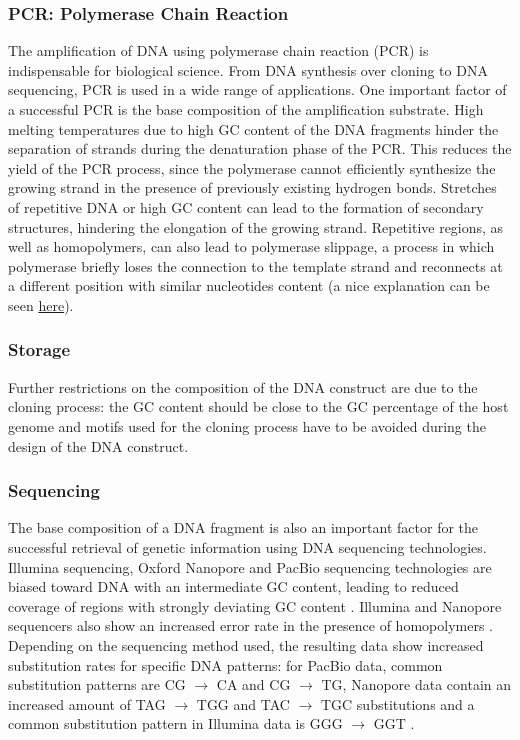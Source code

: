 \subsubsection{PCR: Polymerase Chain Reaction}

The amplification of DNA using polymerase chain reaction (PCR) is indispensable for biological science. From DNA synthesis over cloning to DNA sequencing, PCR is used in a wide range of applications. 
One important factor of a successful PCR is the base composition of the amplification substrate. High melting temperatures due to high GC content of the DNA fragments hinder the separation of strands during the denaturation phase of the PCR. 
This reduces the yield of the PCR process, since the polymerase cannot efficiently synthesize the growing strand in the presence of previously existing hydrogen bonds. 
Stretches of repetitive DNA or high GC content can lead to the formation of secondary structures, hindering the elongation of the growing strand. 
Repetitive regions, as well as homopolymers, can also lead to polymerase slippage, a process in which polymerase briefly loses the connection to the template strand and reconnects at a different position with similar nucleotides content \cite{bib:102144} (a nice explanation can be seen \href{https://yewtu.be/watch?v=nRPNJ1T-ggg}{here}).

\subsubsection{Storage}

Further restrictions on the composition of the DNA construct are due to the cloning process: the GC content should be close to the GC percentage of the host genome and motifs used for the cloning process have to be avoided during the design of the DNA construct.

\subsubsection{Sequencing}

The base composition of a DNA fragment is also an important factor for the successful retrieval of genetic information using DNA sequencing technologies.
Illumina sequencing, Oxford Nanopore and PacBio sequencing technologies are biased toward DNA with an intermediate GC content, leading to reduced coverage of regions with strongly deviating GC content \cite{bib:101093}. 
Illumina and Nanopore sequencers also show an increased error rate in the presence of homopolymers \cite{bib:101093}.
Depending on the sequencing method used, the resulting data show increased substitution rates for specific DNA patterns: for PacBio data, common substitution patterns are CG $\rightarrow$ CA and CG $\rightarrow$ TG, Nanopore data contain an increased amount of TAG $\rightarrow$ TGG and TAC $\rightarrow$ TGC substitutions \cite{bib:1012688} and a common substitution pattern in Illumina data is GGG $\rightarrow$ GGT \cite{bib:101186}.

